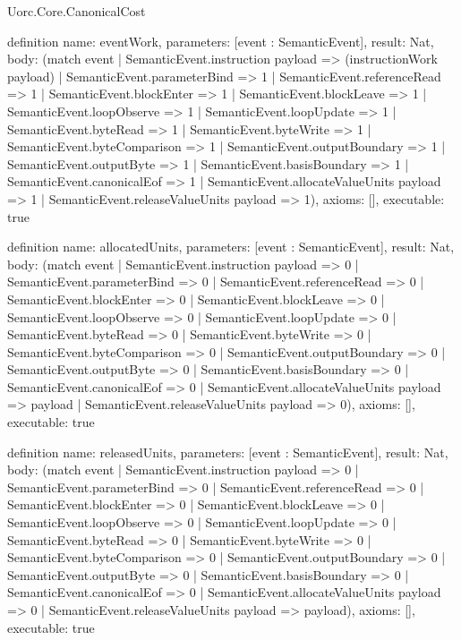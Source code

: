 \begin{lexlean}{Uorc.Core.CanonicalCost}
\begin{semanticmodule}
definition{
  name: eventWork,
  parameters: [event : SemanticEvent],
  result: Nat,
  body: (match event
    | SemanticEvent.instruction payload => (instructionWork payload)
    | SemanticEvent.parameterBind => 1
    | SemanticEvent.referenceRead => 1
    | SemanticEvent.blockEnter => 1
    | SemanticEvent.blockLeave => 1
    | SemanticEvent.loopObserve => 1
    | SemanticEvent.loopUpdate => 1
    | SemanticEvent.byteRead => 1
    | SemanticEvent.byteWrite => 1
    | SemanticEvent.byteComparison => 1
    | SemanticEvent.outputBoundary => 1
    | SemanticEvent.outputByte => 1
    | SemanticEvent.basisBoundary => 1
    | SemanticEvent.canonicalEof => 1
    | SemanticEvent.allocateValueUnits payload => 1
    | SemanticEvent.releaseValueUnits payload => 1),
  axioms: [],
  executable: true
}

definition{
  name: allocatedUnits,
  parameters: [event : SemanticEvent],
  result: Nat,
  body: (match event
    | SemanticEvent.instruction payload => 0
    | SemanticEvent.parameterBind => 0
    | SemanticEvent.referenceRead => 0
    | SemanticEvent.blockEnter => 0
    | SemanticEvent.blockLeave => 0
    | SemanticEvent.loopObserve => 0
    | SemanticEvent.loopUpdate => 0
    | SemanticEvent.byteRead => 0
    | SemanticEvent.byteWrite => 0
    | SemanticEvent.byteComparison => 0
    | SemanticEvent.outputBoundary => 0
    | SemanticEvent.outputByte => 0
    | SemanticEvent.basisBoundary => 0
    | SemanticEvent.canonicalEof => 0
    | SemanticEvent.allocateValueUnits payload => payload
    | SemanticEvent.releaseValueUnits payload => 0),
  axioms: [],
  executable: true
}

definition{
  name: releasedUnits,
  parameters: [event : SemanticEvent],
  result: Nat,
  body: (match event
    | SemanticEvent.instruction payload => 0
    | SemanticEvent.parameterBind => 0
    | SemanticEvent.referenceRead => 0
    | SemanticEvent.blockEnter => 0
    | SemanticEvent.blockLeave => 0
    | SemanticEvent.loopObserve => 0
    | SemanticEvent.loopUpdate => 0
    | SemanticEvent.byteRead => 0
    | SemanticEvent.byteWrite => 0
    | SemanticEvent.byteComparison => 0
    | SemanticEvent.outputBoundary => 0
    | SemanticEvent.outputByte => 0
    | SemanticEvent.basisBoundary => 0
    | SemanticEvent.canonicalEof => 0
    | SemanticEvent.allocateValueUnits payload => 0
    | SemanticEvent.releaseValueUnits payload => payload),
  axioms: [],
  executable: true
}


\end{semanticmodule}
\end{lexlean}
